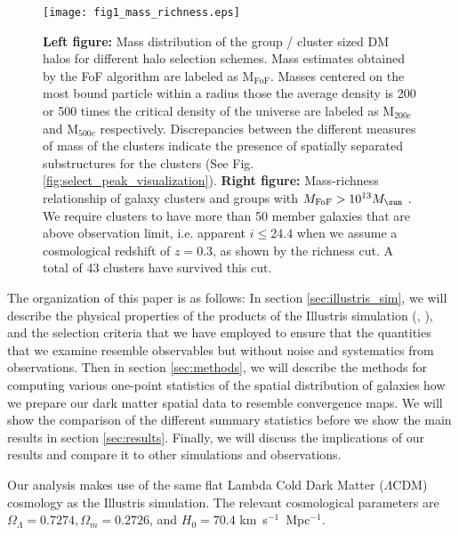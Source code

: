\begin{figure*}
	\texttt{[image: fig1\_mass\_richness.eps]}
	\caption{ {\bf Left figure:} Mass distribution of the group / cluster sized 
		DM halos for different halo selection schemes. Mass estimates obtained by the
		FoF algorithm are labeled as  M$_{\text{FoF}}$.
		Masses centered on the most bound particle within a radius those the 
		average density is 200 or 500 times the critical density of the universe are 
		labeled as M$_{200c}$ and M$_{500c}$ respectively. 
		Discrepancies between the different
		measures of mass of the clusters indicate the presence of spatially
		separated substructures for the clusters (See Fig. 
		\ref{fig:select_peak_visualization}). {\bf Right figure:} 
		Mass-richness relationship of galaxy clusters and groups with 
		$M_{\rm FoF} > 10^{13} M_{\sun}$ . We require clusters to have more than 50 member 
		galaxies that are above observation limit, i.e. apparent $i \leq 24.4$ when 
		we assume a cosmological redshift
of $z=0.3$, as shown by the richness cut. A total of 43 clusters have 
survived this cut. \label{fig:mass_richness}}
\end{figure*}

The organization of this paper is as follows:
In section \ref{sec:illustris_sim}, we will describe the physical properties of 
the products of the Illustris
simulation (\citealt{Vogelsberger2014}, \citealt{Genel2014a}), 
and the selection criteria that we have employed to ensure that the
quantities that we examine resemble observables but without noise and
systematics from observations. 
Then in section \ref{sec:methods}, 
we will describe the methods for computing various 
one-point statistics of the spatial distribution of galaxies how we prepare our dark
matter spatial data to resemble convergence maps. We will show the comparison
of the different summary statistics before we show the main results
in section \ref{sec:results}. Finally, we will discuss the implications of our
results and compare it to other simulations and observations.

	Our analysis makes use of the same flat Lambda Cold Dark Matter ($\Lambda$CDM) cosmology
as the Illustris simulation. The relevant cosmological parameters are
$\Omega_\Lambda = 0.7274, \Omega_m = 0.2726$, and $H_0 = 70.4$
km~s$^{-1}$~Mpc$^{-1}$.

